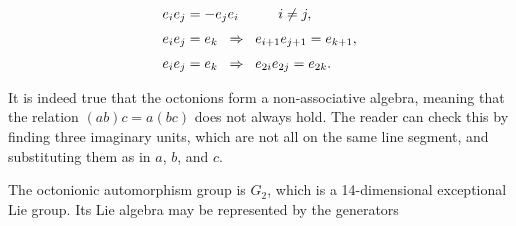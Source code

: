 \documentclass[letterpaper,12pt,titlepage,oneside,final]{book}
\begin{document}
\begin{equation}\begin{array}{l} 
e_ie_j = -e_je_i \hspace{1cm} i\neq j, \vspace{2mm}\\
e_ie_j = e_k \hspace{2mm} \Rightarrow  \hspace{2mm}e_{i+1}e_{j+1} = e_{k+1},\vspace{2mm}\\
e_ie_j = e_k \hspace{2mm}\Rightarrow \hspace{2mm} e_{2i}e_{2j} = e_{2k}. 
\end{array}\end{equation}


It is indeed true that the octonions form a non-associative algebra, meaning that the relation $(ab)c =a(bc)$ does not always hold.   The reader can check this by finding three imaginary units, which are not all on the same line segment, and substituting them as in $a$, $b$, and $c$.  

The octonionic automorphism group is $G_2$, which is a 14-dimensional exceptional Lie group.  Its Lie algebra may be represented by the generators 
\end{document}
